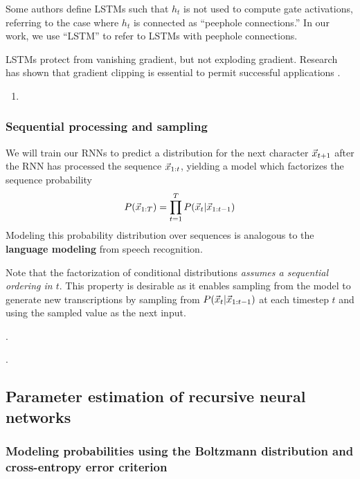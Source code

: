 Some authors define LSTMs such that $h_t$ is not used to compute gate activations,
referring to the case where $h_t$ is connected as ``peephole connections.'' In our
work, we use ``LSTM'' to refer to LSTMs with peephole connections.

LSTMs protect from vanishing gradient, but not exploding gradient. Research has shown
that gradient clipping is essential to permit successful applications \cite{Pascanu2012}.
\begin{enumerate}
    \item 
\end{enumerate}


\subsubsection{Sequential processing and sampling}

We will train our RNNs to predict a distribution for the next character
$\vec{x}_{t+1}$ after the RNN has processed the sequence $\vec{x}_{1:t}$,
yielding a model which factorizes the sequence probability
\begin{equation}
    P(\vec{x}_{1:T}) = \prod_{t=1}^T P(\vec{x}_t | \vec{x}_{1:t-1} )
\end{equation}
Modeling this probability distribution over sequences is analogous to the
\textbf{language modeling} from speech recognition.

Note that the factorization of conditional distributions \emph{assumes a
sequential ordering in $t$}. This property is desirable as it enables sampling
from the model to generate new transcriptions by sampling from $P(\vec{x}_t |
\vec{x}_{1:t-1})$ at each timestep $t$ and using the sampled value as the next
input.

.

.

\subsection{Parameter estimation of recursive neural networks}

\subsubsection{Modeling probabilities using the Boltzmann distribution and cross-entropy error criterion}

